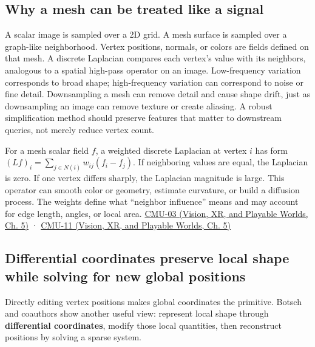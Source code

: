 \subsection{Why a mesh can be treated like a signal}\label{03-visual-computing-i-ch002-why-a-mesh-can-be-treated-like-a-signal}

A scalar image is sampled over a 2D grid. A mesh surface is sampled over a graph-like neighborhood. Vertex positions, normals, or colors are fields defined on that mesh. A discrete Laplacian compares each vertex's value with its neighbors, analogous to a spatial high-pass operator on an image. Low-frequency variation corresponds to broad shape; high-frequency variation can correspond to noise or fine detail. Downsampling a mesh can remove detail and cause shape drift, just as downsampling an image can remove texture or create aliasing. A robust simplification method should preserve features that matter to downstream queries, not merely reduce vertex count.

For a mesh scalar field \(f\), a weighted discrete Laplacian at vertex \(i\) has form \((Lf)_i=\sum_{j\in N(i)}w_{ij}(f_i-f_j)\). If neighboring values are equal, the Laplacian is zero. If one vertex differs sharply, the Laplacian magnitude is large. This operator can smooth color or geometry, estimate curvature, or build a diffusion process. The weights define what ``neighbor influence'' means and may account for edge length, angles, or local area. \href{../07-Vision-XR-and-Playable-Worlds/main.pdf\#nameddest=04-visual-computing-ii-ch036-cmu-03---vector-calculus-preview}{CMU-03 (Vision, XR, and Playable Worlds, Ch. 5)} · \href{../07-Vision-XR-and-Playable-Worlds/main.pdf\#nameddest=04-visual-computing-ii-ch036-cmu-11---digital-geometry-processing}{CMU-11 (Vision, XR, and Playable Worlds, Ch. 5)}

\subsection{Differential coordinates preserve local shape while solving for new global positions}\label{03-visual-computing-i-ch002-differential-coordinates-preserve-local-shape-while-solving-for-new-global-positions}

Directly editing vertex positions makes global coordinates the primitive. Botsch and coauthors show another useful view: represent local shape through \textbf{differential coordinates}, modify those local quantities, then reconstruct positions by solving a sparse system.

